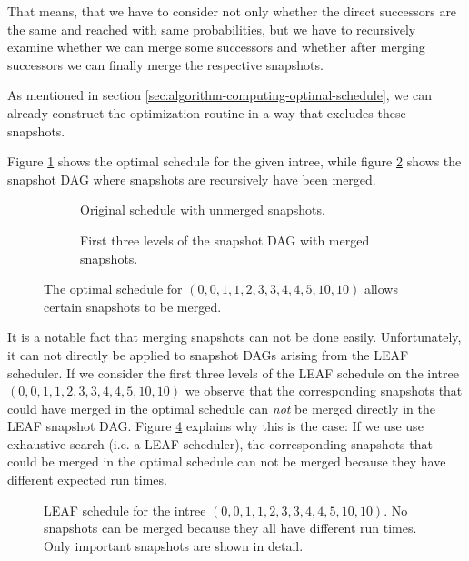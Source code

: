 That means, that we have to consider not only whether the direct successors are the same and reached with same probabilities, but we have to recursively examine whether we can merge some successors and whether after merging successors we can finally merge the respective snapshots.

As mentioned in section \ref{sec:algorithm-computing-optimal-schedule}, we can already construct the optimization routine in a way that excludes these snapshots.

Figure \ref{00112334451010-original-optimal-schedule} shows the optimal schedule for the given intree, while figure \ref{00112334451010-merged-optimal-schedule} shows the snapshot DAG where snapshots are recursively have been merged.

\begin{figure}[th]
  \centering
  \begin{subfigure}{.58\textwidth}
    \centering
    
    \caption{Original schedule with unmerged snapshots.}
    \label{00112334451010-original-optimal-schedule}
  \end{subfigure}
  \quad
  \begin{subfigure}{.3\textwidth}
    \centering
    
    \caption{First three levels of the snapshot DAG with merged snapshots.}
    \label{00112334451010-merged-optimal-schedule}
  \end{subfigure}
  \caption{The optimal schedule for $(0,0,1,1,2,3,3,4,4,5,10,10)$ allows certain snapshots to be merged.}
  \label{fig:p3-merge-snapshots-00112334451010}
\end{figure}

It is a notable fact that merging snapshots can not be done easily. Unfortunately, it can not directly be applied to snapshot DAGs arising from the LEAF scheduler. If we consider the first three levels of the LEAF schedule on the intree $(0,0,1,1,2,3,3,4,4,5,10,10)$ we observe that the corresponding snapshots that could have merged in the optimal schedule can \emph{not} be merged directly in the LEAF snapshot DAG. Figure \ref{fig:p3-00112334451010-leaf-schedule-no-merging} explains why this is the case: If we use use exhaustive search (i.e. a LEAF scheduler), the corresponding snapshots that could be merged in the optimal schedule can not be merged because they have different expected run times.

\begin{figure}[ht]
  \centering{}
  
  \caption{LEAF schedule for the intree $(0,0,1,1,2,3,3,4,4,5,10,10)$. No snapshots can be merged because they all have different run times. Only important snapshots are shown in detail.}
  \label{fig:p3-00112334451010-leaf-schedule-no-merging}
\end{figure}

